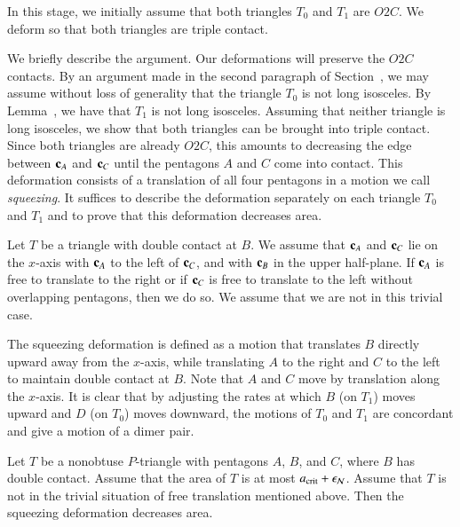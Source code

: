 In this stage, we initially assume that both triangles $T_0$ and $T_1$
are $O2C$.  We deform so that both triangles are triple contact.

We briefly describe the argument.  Our deformations will preserve the
$O2C$ contacts.  By an argument made in the second paragraph of
Section~, we may assume without loss of generality that
the triangle $T_0$ is not long isosceles.  By
Lemma~, we have that $T_1$ is not long
isosceles.  Assuming that neither triangle is long isosceles, we show
that both triangles can be brought into triple contact.  Since both
triangles are already $O2C$, this amounts to decreasing the edge
between ${\mathbf c}_A$ and ${\mathbf c}_C$ until the pentagons $A$ and $C$ come into
contact.  This deformation consists of a translation of all four
pentagons in a motion we call {\it squeezing}.  It suffices to
describe the deformation separately on each triangle $T_0$ and $T_1$
and to prove that this deformation decreases area.

Let $T$ be a triangle with double contact at $B$.  We assume that
${\mathbf c}_A$ and ${\mathbf c}_C$ lie on the $x$-axis with ${\mathbf c}_A$ to the left of
${\mathbf c}_C$, and with ${\mathbf c}_B$ in the upper half-plane.  If ${\mathbf c}_A$ is free to
translate to the right or if ${\mathbf c}_C$ is free to translate to the left
without overlapping pentagons, then we do so.  We assume that we are
not in this trivial case.

The squeezing deformation is defined as a motion that translates $B$
directly upward away from the $x$-axis, while translating $A$ to the
right and $C$ to the left to maintain double contact at $B$.  Note
that $A$ and $C$ move by translation along the $x$-axis.  It is clear
that by adjusting the rates at which $B$ (on $T_1$) moves upward and
$D$ (on $T_0$) moves downward, the motions of $T_0$ and $T_1$ are
concordant and give a motion of a dimer pair.

\begin{lemma}  
  Let $T$ be a nonobtuse $P$-triangle with pentagons $A$, $B$, and
  $C$, where $B$ has double contact.  Assume that the area of $T$ is
  at most $a_\text{crit}+\epsilon_{\mathcal N}$.  Assume that $T$ is not in the trivial
  situation of free translation mentioned above.  Then the squeezing
  deformation decreases area.
\end{lemma}

